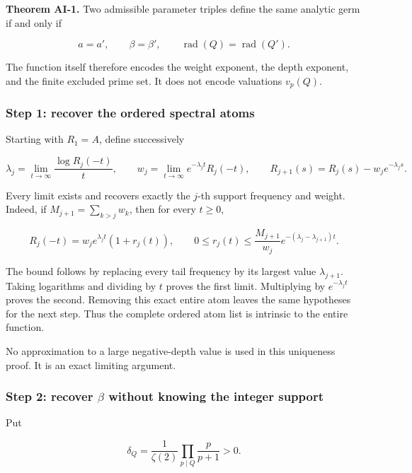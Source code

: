 \textbf{Theorem AI-1.} Two admissible parameter triples define the same
analytic germ if and only if

\[
 a=a',\qquad \beta=\beta',\qquad
 \operatorname{rad}(Q)=\operatorname{rad}(Q').
\]

The function itself therefore encodes the weight exponent, the depth
exponent, and the finite excluded prime set. It does not encode
valuations \(v_p(Q)\).

\hypertarget{step-1-recover-the-ordered-spectral-atoms}{%
\subsubsection{Step 1: recover the ordered spectral
atoms}\label{step-1-recover-the-ordered-spectral-atoms}}

Starting with \(R_1=A\), define successively

\[
 \lambda_j=\lim_{t\to\infty}\frac{\log R_j(-t)}t,
 \qquad
 w_j=\lim_{t\to\infty}e^{-\lambda_jt}R_j(-t),
 \qquad
 R_{j+1}(s)=R_j(s)-w_je^{-\lambda_js}.
\]

Every limit exists and recovers exactly the \(j\)-th support frequency
and weight. Indeed, if \(M_{j+1}=\sum_{k>j}w_k\), then for every
\(t\ge0\),

\[
 R_j(-t)=w_je^{\lambda_jt}(1+r_j(t)),\qquad
 0\le r_j(t)\le\frac{M_{j+1}}{w_j}
                    e^{-(\lambda_j-\lambda_{j+1})t}.
\]

The bound follows by replacing every tail frequency by its largest value
\(\lambda_{j+1}\). Taking logarithms and dividing by \(t\) proves the
first limit. Multiplying by \(e^{-\lambda_jt}\) proves the second.
Removing this exact entire atom leaves the same hypotheses for the next
step. Thus the complete ordered atom list is intrinsic to the entire
function.

No approximation to a large negative-depth value is used in this
uniqueness proof. It is an exact limiting argument.

\hypertarget{step-2-recover-beta-without-knowing-the-integer-support}{%
\subsubsection{\texorpdfstring{Step 2: recover \(\beta\) without knowing
the integer
support}{Step 2: recover \textbackslash beta without knowing the integer support}}\label{step-2-recover-beta-without-knowing-the-integer-support}}

Put

\[
 \delta_Q=\frac1{\zeta(2)}\prod_{p\mid Q}\frac{p}{p+1}>0.
\]

